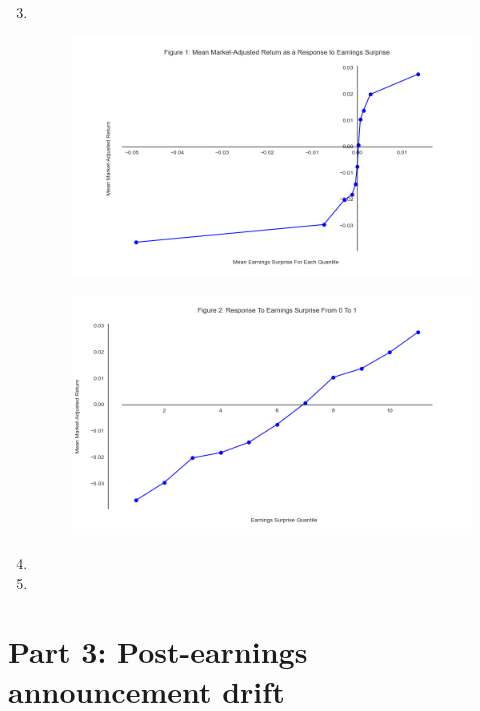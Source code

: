 \documentclass[11pt]{article}
\begin{document}
\begin{enumerate}
\setcounter{enumi}{2}
\renewcommand{\labelenumi}{(\theenumi)}
    \item \, \\
    
    \begin{figure}[H] 
        \centering
        \includegraphics[width=.8\textwidth]{fig1.png}
    \end{figure}

    \begin{figure}[H] 
        \centering
        \includegraphics[width=.8\textwidth]{fig2.png}
    \end{figure}
    
    \item
    
    \item

\end{enumerate}

\section{Part 3: Post-earnings announcement drift}
\end{document}

